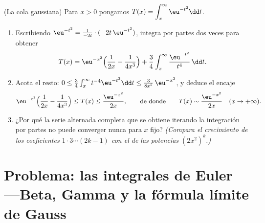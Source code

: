 \begin{exercise}[$\star\star\star$]\label{exo:b2:integration:12}
(La cola gaussiana) Para $x > 0$ pongamos $T(x) = \displaystyle
\int_x^\infty \eu^{-t^2}\dd t$.
\begin{enumerate}
  \item Escribiendo $\eu^{-t^2} = \frac{1}{-2t}\cdot(-2t\,\eu^{-t^2})$,
        integra por partes dos veces para obtener
        \[
        T(x) = \eu^{-x^2}\Bigl(\frac{1}{2x} -
        \frac{1}{4x^3}\Bigr) +
        \frac34\int_x^\infty \frac{\eu^{-t^2}}{t^4}\,\dd t .
        \]
  \item Acota el resto: $0 \leq \frac34\int_x^\infty
        t^{-4}\eu^{-t^2}\dd t \leq \frac{3}{8x^5}\,\eu^{-x^2}$, y
        deduce el encaje
        \[
        \eu^{-x^2}\Bigl(\frac{1}{2x} - \frac{1}{4x^3}\Bigr)
        \leq T(x) \leq \frac{\eu^{-x^2}}{2x},
        \qquad\text{de donde}\qquad
        T(x) \sim \frac{\eu^{-x^2}}{2x} \quad (x \to +\infty).
        \]
  \item ¿Por qué la serie alternada completa que se obtiene
        iterando la integración por partes no puede converger nunca
        para $x$ fijo? \emph{(Compara el crecimiento de los
        coeficientes $1\cdot3\cdots(2k-1)$ con el de las potencias
        $(2x^2)^k$.)}
\end{enumerate}
\end{exercise}

\section{Problema: las integrales de Euler ---Beta, Gamma y la
fórmula límite de Gauss}

